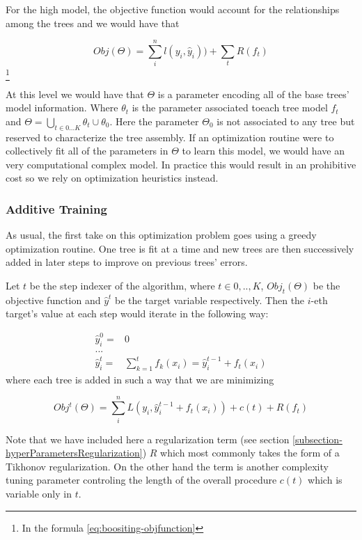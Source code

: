 \documentclass{article}%
\theoremstyle{definition}
\begin{document}
For the high model, the objective function would account for the relationships among the trees and we would have that

\[ Obj(\Theta) = \sum_i^n l(y_i,\hat{y}_i))  +  \sum_t R(f_t) \] \label{eq:boositing-objfunction} \footnote{In the formula \ref{eq:boositing-objfunction} }
%    

At this level we would have that $\Theta$ is a parameter encoding all of the base trees' model information. Where $\theta_t$ is the parameter associated toeach tree model $f_t$ and $\Theta =  \bigcup_{t \in {0...K}} \theta_t  \cup \theta_0$.  Here the parameter $\Theta_0$ is not associated to any tree but reserved to characterize the tree assembly. If an optimization routine were to collectively fit all of the parameters in $\Theta$ to learn this model, we would have an very computational complex model. 
In practice this would result in an prohibitive cost so we rely on optimization heuristics  instead. 

\subsubsection{Additive Training}

As usual, the first take on this optimization problem goes using a greedy optimization routine. One tree is fit at a time and new trees are then successively added in later steps to improve on previous trees' errors.

Let $t$ be the step indexer of the algorithm, where $t \in {0,..,K}$, $Obj_t(\Theta)$ be the objective function and $\hat{y}^t$ be the target variable respectively. Then the $i$-eth target's value at each step would iterate in the following way:

\begin{equation} \label{eq:gb-targetSteps}
\begin{split}
\hat{y}_i^0 = & 0 \\
... \\ 
\hat{y}_i^t = &\sum_{k=1}^{t} f_k(x_i) = \hat{y}^{t-1}_i +  f_t(x_i)
\end{split}
\end{equation}
where each tree is added in such a way that we are minimizing

\begin{equation}
Obj^t(\Theta) =  \sum_i^n L(y_i, \hat{y}^{t-1}_i +  f_t(x_i) ) + c(t) + R(f_t) 
\end{equation}


Note that we have included here a regularization term (see section \ref{subsection-hyperParametersRegularization}) $R$ which most commonly takes the form of a  Tikhonov regularization. On the other hand the term is another complexity tuning parameter controling the length of the overall procedure $c(t)$ which is variable only in $t$. 
\end{document}
